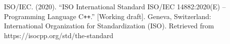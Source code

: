 \begin{thebibliography}{00}
	ISO/IEC. (2020). ``ISO International Standard ISO/IEC 14882:2020(E) – Programming Language C\texttt{++}.'' [Working draft]. Geneva, Switzerland: International Organization for Standardization (ISO). Retrieved from https://isocpp.org/std/the-standard
\end{thebibliography}
